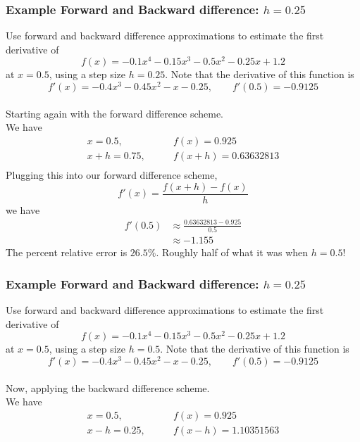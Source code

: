 \documentclass{if-beamer}
\begin{document}
\begin{frame}
	\frametitle{Example Forward and Backward difference: $h= 0.25$}
	Use forward and backward difference approximations to estimate the first derivative of
	$$f(x) = -0.1x^4-0.15x^3-0.5x^2-0.25x+1.2 $$
	at $x=0.5$, using a step size $h = 0.25$. Note that the derivative of this function is
	$$f'(x) = -0.4x^3-0.45x^2-x-0.25, \qquad f'(0.5) = -0.9125$$
	\\\vspace{5pt}
	Starting again with the forward difference scheme.\\\vspace{5pt}
	We have
	\begin{align*}
		x = 0.5, \qquad &f(x) = 0.925\\
		x+h = 0.75, \qquad &f(x+h) = 0.63632813\\
	\end{align*}
	Plugging this into our forward difference scheme, 
	$$f'(x) = \frac{f(x+h)-f(x)}{h} $$
	we have
	\begin{align*}
		f'(0.5) &\approx \frac{0.63632813-0.925}{0.5} \\
		&\approx -1.155
	\end{align*}
	The percent relative error is $26.5\%$. Roughly half of what it was when $h=0.5$!
\end{frame}


\begin{frame}
	\frametitle{Example Forward and Backward difference: $h= 0.25$}
	Use forward and backward difference approximations to estimate the first derivative of
	$$f(x) = -0.1x^4-0.15x^3-0.5x^2-0.25x+1.2 $$
	at $x=0.5$, using a step size $h = 0.5$. Note that the derivative of this function is
	$$f'(x) = -0.4x^3-0.45x^2-x-0.25, \qquad f'(0.5) = -0.9125$$
	\\\vspace{5pt}
	Now, applying the backward difference scheme.\\\vspace{5pt}
	We have
	\begin{align*}
		x = 0.5, \qquad &f(x) = 0.925\\
		x-h = 0.25, \qquad &f(x-h) = 1.10351563\\
	\end{align*}
\end{frame}
\end{document}
